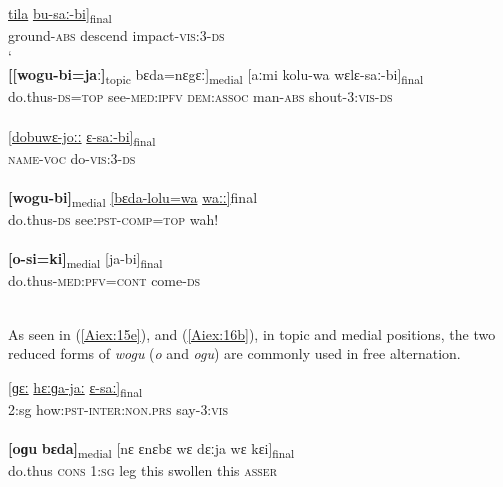 \documentclass[output=paper]{LSP/langsci}
\begin{document}
\begin{exe}
\ex \label{Aiex:15ae}
\begin{xlist}
\ex \label{Aiex:15a}
\gll \underline{\smash{[isa-jaː}}	\underline{tila}	\underline{bu-saː-bi}]\textsubscript{final}\\
ground-\textsc{abs}	descend	impact-\textsc{vis:3-ds}\\
\glt	‘‎\\
\ex \label{Aiex:15b}
\gll	\textbf{[[wogu-bi=jaː]}\textsubscript{topic}	bɛda=nɛgɛː]\textsubscript{medial}	[aːmi	kolu-wa	wɛlɛ-saː-bi]\textsubscript{final}\\
do.thus-\textsc{ds=top}	see-\textsc{med:ipfv}	\textsc{dem:assoc}	man-\textsc{abs}	shout-\textsc{3:vis-ds}\\
\glt	{}\\
\ex \label{Aiex:15c}
\gll	\underline{[dobuwɛ-joːː}	\underline{ɛ-saː-bi]}\textsubscript{final}\\
\textsc{name-voc}	do-\textsc{vis:3-ds}\\
\glt	{}\\
\ex \label{Aiex:15d}
\gll	\textbf{[wogu-bi]}\textsubscript{medial}	\underline{[bɛda-lolu=wa}	\underline{waːː]}{final}\\
do.thus-\textsc{ds}	see\textsc{ːpst-comp=top}	wah!\\
\glt	{}\\
\ex \label{Aiex:15e}
\gll	\textbf{[o-si=ki]}\textsubscript{medial}	[ja-bi]\textsubscript{final}\\
do.thus\textsc{-med:pfv=cont}	come-\textsc{ds}\\
\glt	{}\\
\end{xlist}
\end{exe}

As seen in (\ref{Aiex:15e}), and (\ref{Aiex:16b}), in topic and medial positions, the two reduced forms of \textit{wogu} (\textit{o} and \textit{ogu}) are commonly used in free alternation.

\begin{exe}
\ex \label{Aiex:16ab}
\begin{xlist}
\ex \label{Aiex:16a}
\gll \underline{[ɡɛː}	\underline{hɛːɡa-jaː}	\underline{ɛ-saː]}\textsubscript{final}\\
\textsc{2}:sg	how\textsc{:pst-inter:non.prs}	say-\textsc{3:vis}\\
\glt {}\\
\ex \label{Aiex:16b}
\gll \textbf{[oɡu}	\textbf{bɛda]}\textsubscript{medial}	[nɛ	ɛnɛbɛ	wɛ	dɛːja	wɛ	kɛi]\textsubscript{final}\\
do.thus	\textsc{cons}	\textsc{1:sg}	leg	this	swollen	this	\textsc{asser}\\
\glt {}\\
\end{xlist}
\end{exe}
\end{document}
